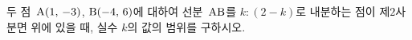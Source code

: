 두 점~$\mathrm{A}(1,\,-3)$, $\mathrm{B}(-4,\,6)$에 대하여 선분~$\mathrm{AB}$를 $k:(2-k)$로 내분하는 점이 제$2$사분면 위에 있을 때, 실수 $k$의 값의 범위를 구하시오.
